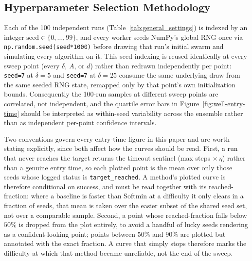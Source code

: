 \documentclass{article}
\theoremstyle{plain}
\theoremstyle{definition}
\theoremstyle{remark}
\begin{document}
\subsection{Hyperparameter Selection Methodology}
\label{app:hyperparameter-methodology}

Each of the 100 independent runs (Table~\ref{tab:general_settings}) is indexed by an integer $\text{seed}\in\{0,\dots,99\}$, and every worker seeds NumPy's global RNG once via \texttt{np.random.seed(seed*1000)} before drawing that run's initial swarm and simulating every algorithm on it. This seed indexing is reused identically at every sweep point (every $\delta$, $A$, or $d$) rather than redrawn independently per point: \texttt{seed=7} at $\delta=5$ and \texttt{seed=7} at $\delta=25$ consume the same underlying draw from the same seeded RNG state, remapped only by that point's own initialization bounds. Consequently the 100-run samples at different sweep points are correlated, not independent, and the quartile error bars in Figure~\ref{fig:well-entry-time} should be interpreted as within-seed variability across the ensemble rather than as independent per-point confidence intervals.

Two conventions govern every entry-time figure in this paper and are worth stating explicitly, since both affect how the curves should be read. First, a run that never reaches the target returns the timeout sentinel (max steps $\times\,\eta$) rather than a genuine entry time, so each plotted point is the mean over only those seeds whose logged status is \texttt{target\_reached}. A method's plotted curve is therefore conditional on success, and must be read together with its reached-fraction: where a baseline is faster than Softmin at a difficulty it only clears in a fraction of seeds, that mean is taken over the easier subset of the shared seed set, not over a comparable sample. Second, a point whose reached-fraction falls below $50\%$ is dropped from the plot entirely, to avoid a handful of lucky seeds rendering as a confident-looking point; points between $50\%$ and $90\%$ are plotted but annotated with the exact fraction. A curve that simply stops therefore marks the difficulty at which that method became unreliable, not the end of the sweep.
\end{document}
